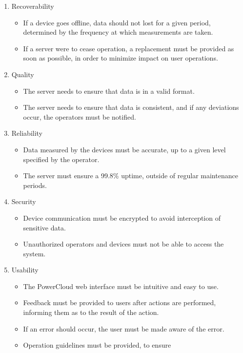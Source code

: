 \documentclass{article}
\begin{document}
	\begin{enumerate}
		\item Recoverability
			\begin{itemize}
				\item If a device goes offline, data should not lost for 
				a given period, determined by the frequency at which 
				measurements are taken.
				\item If a server were to cease operation, a replacement 
				must be provided as soon as possible, in order to 
				minimize impact on user operations.
			\end{itemize}
		\item Quality
			\begin{itemize}
				\item The server needs to ensure that data is in a valid 
				format.
				\item The server needs to ensure that data is consistent, 
				and if any deviations occur, the operators must be 
				notified.
			\end{itemize}
		\item Reliability
			\begin{itemize}
				\item Data measured by the devices must be accurate, up 
				to a given level specified by the operator.
				\item The server must ensure a 99.8\% uptime, outside of 
				regular maintenance periods.
			\end{itemize}
		\item Security
			\begin{itemize}
				\item Device communication must be encrypted to avoid 
				interception of sensitive data.
				\item Unauthorized operators and devices must not be able 
				to access the system.
			\end{itemize}
		\item Usability
			\begin{itemize}
				\item The PowerCloud web interface must be intuitive and 
				easy to use.
				\item Feedback must be provided to users after actions 
				are performed, informing them as to the result of the 
				action.
				\item If an error should occur, the user must be made 
				aware of the error.
				\item Operation guidelines must be provided, to ensure 

\end{itemize}
\end{enumerate}
\end{document}
